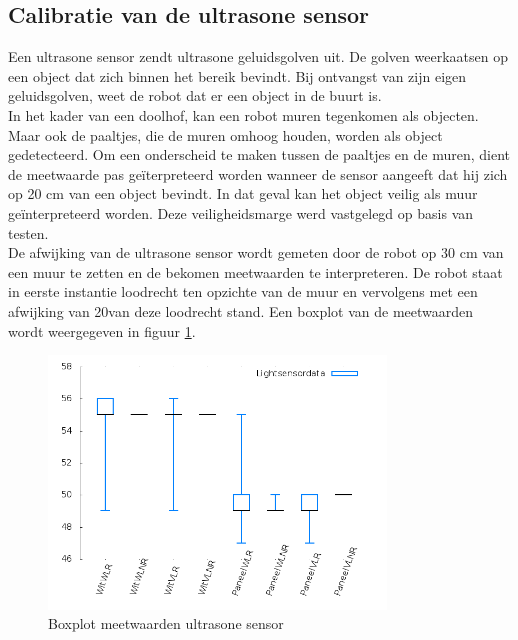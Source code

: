 \documentclass[tt3]{penoverslag}
\begin{document}
\subsection{Calibratie van de ultrasone sensor} %
\label{ssec:calibUS}
Een ultrasone sensor zendt ultrasone geluidsgolven uit. De golven weerkaatsen op een object dat zich binnen het bereik bevindt. Bij ontvangst van zijn eigen geluidsgolven, weet de robot dat er een object in de buurt is.\\
In het kader van een doolhof, kan een robot muren tegenkomen als objecten. Maar ook de paaltjes, die de muren omhoog houden, worden als object gedetecteerd. Om een onderscheid te maken tussen de paaltjes en de muren, dient de meetwaarde pas ge\"iterpreteerd worden wanneer de sensor aangeeft dat hij zich op 20 cm van een object bevindt. In dat geval kan het object veilig als muur geïnterpreteerd worden. Deze veiligheidsmarge werd vastgelegd op basis van testen.\\
De afwijking van de ultrasone sensor wordt gemeten door de robot op 30 cm van een muur te zetten en de bekomen meetwaarden te interpreteren. De robot staat in eerste instantie loodrecht ten opzichte van de muur en vervolgens met een afwijking van 20\degree van deze loodrecht stand. Een boxplot van de meetwaarden wordt weergegeven in figuur \ref{fig:boxUltra}.

\begin{figure}[tbp]
\begin{center}
    \includegraphics[width=0.8\textwidth]{boxplotLichtSensor}
    \caption{Boxplot meetwaarden ultrasone sensor}
    \label{fig:boxUltra}
\end{center}
\end{figure}
\end{document}
